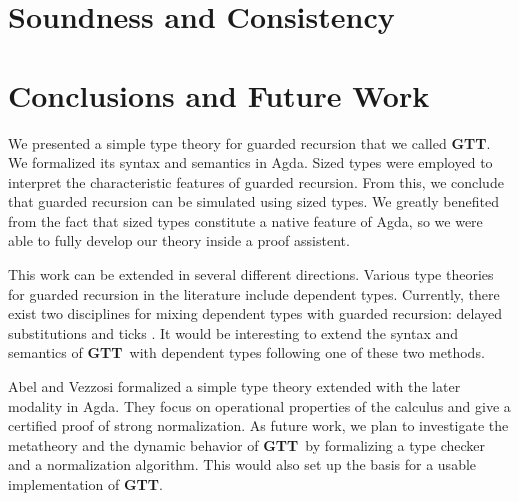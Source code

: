 \documentclass[a4paper,UKenglish,cleveref, autoref,numberwithinsect]{lipics-v2019}
\newcommand{\remove}[1]{}
\newcommand{\GTT}{\textbf{GTT}}
\begin{document}
\section{Soundness and Consistency}
\label{sec:consistent}




%

\section{Conclusions and Future Work}
\label{sec:concl}
We presented a simple type theory for guarded recursion that we called \GTT. We
formalized its syntax and semantics in Agda. Sized types
were employed to interpret the characteristic
features of guarded recursion. From this, we conclude that guarded
recursion can be simulated using sized types. We greatly benefited
from the fact that sized types constitute a native feature of Agda, so
we were able to fully develop our theory inside a proof assistent. 

This work can be extended in several different directions.
Various type theories for guarded recursion in the literature include
dependent types. Currently, there exist two disciplines for mixing
dependent types with guarded recursion: delayed substitutions
\cite{bizjak2016guarded} and ticks \cite{BahrGM17}. It would be interesting to extend
the syntax and semantics of \GTT\ with dependent types following one
of these two methods.

Abel and Vezzosi \cite{AbelV14} formalized a simple type theory
extended with the later modality in Agda. They focus on operational
properties of the calculus and give a certified proof of strong
normalization. As future work, we plan to investigate the metatheory
and the dynamic behavior of \GTT\ by formalizing a  type
checker and a normalization algorithm. This would also set up the
basis for a usable implementation of \GTT.



\remove{
and weakening, and we constructed denotational semantics for it in type theory extended with sized types.
From this, we concluded that this theory is consistent and that guarded recursion can be defined via sized types.

There are several possible ways to improve on this result.
First of all, one could define a dependent version of this type theory extended with multiple clocks.
This can be done in two ways.
Either one extends the object theory with delayed substitutions \cite{bizjak2016guarded} or with ticks \cite{BahrGM17}.
Second of all, with the deep embedding in place, one can further study the meta-theory by defining a formalized type checking and a normalization algorithm.
}
\end{document}
